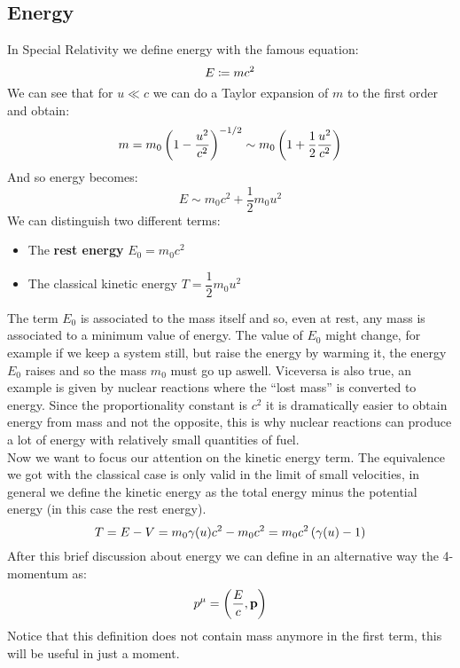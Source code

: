 \subsection{Energy}
In Special Relativity we define energy with the famous equation:
\begin{equation}
  E \coloneqq mc^2
\end{equation}
We can see that for $u \ll c$ we can do a Taylor expansion of $m$ to the first order and obtain:
\begin{equation}
  m = m_0\left(1-\dfrac{u^2}{c^2}\right)^{-1/2} \sim m_0\left(1+\dfrac{1}{2}\dfrac{u^2}{c^2}\right)
\end{equation}
And so energy becomes:
\begin{equation}
  E \sim m_0c^2 + \dfrac{1}{2}m_0u^2
\end{equation}
We can distinguish two different terms:
\begin{itemize}
  \item The \textbf{rest energy} $E_0 = m_0c^2$
  \item The classical kinetic energy $T = \dfrac{1}{2}m_0u^2$
\end{itemize}
The term $E_0$ is associated to the mass itself and so, even at rest, any mass is associated to a minimum value of energy. The value of $E_0$ might change, for example if we keep a system still, but raise the energy by warming it, the energy $E_0$ raises and so the mass $m_0$ must go up aswell. Viceversa is also true, an example is given by nuclear reactions where the ``lost mass'' is converted to energy. Since the proportionality constant is $c^2$ it is dramatically easier to obtain energy from mass and not the opposite, this is why nuclear reactions can produce a lot of energy with relatively small quantities of fuel.\\
Now we want to focus our attention on the kinetic energy term. The equivalence we got with the classical case is only valid in the limit of small velocities, in general we define the kinetic energy as the total energy minus the potential energy (in this case the rest energy).
\begin{equation}
  T = E - V = m_0\gamma(u)c^2 - m_0c^2 = m_0c^2\left(\gamma(u)-1\right)
\end{equation}
After this brief discussion about energy we can define in an alternative way the 4-momentum as:
\begin{equation}
  p^{\mu} = \left(\dfrac{E}{c}, \vb{p}\right)
\end{equation}
Notice that this definition does not contain mass anymore in the first term, this will be useful in just a moment.\\
